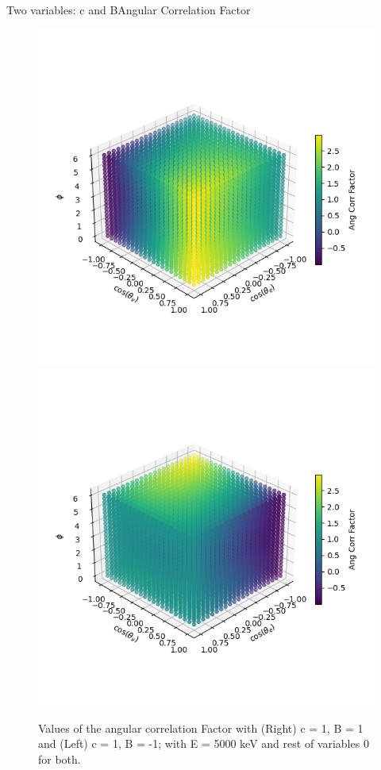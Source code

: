 \documentclass{beamer}
\begin{document}
\begin{frame}{Two variables: c and B}{Angular Correlation Factor}
	\begin{figure}
		\centering
		\includegraphics[width=0.4\paperwidth]{plots/posa_posB_hiE_3D}
		\includegraphics[width=0.4\paperwidth]{plots/posa_negB_hiE_3D}
		\caption{Values of the angular correlation Factor with (Right) c = 1, B = 1 and (Left) c = 1, B = -1; with E = 5000 keV and rest of variables 0 for both.}
	\end{figure}
\end{frame}
\end{document}
